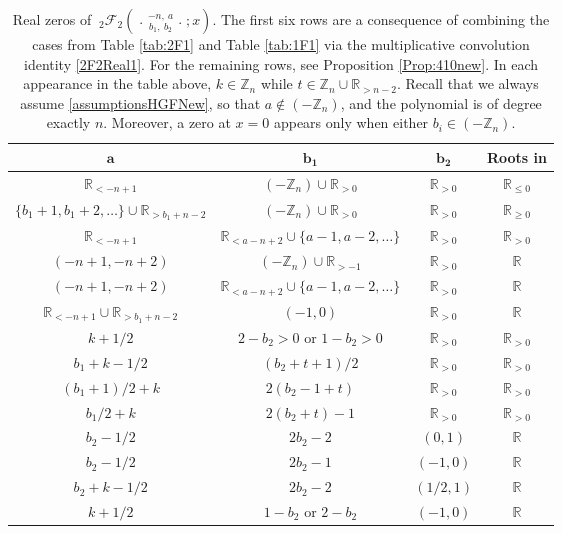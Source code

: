 \documentclass[reqno,11pt]{amsart}
\theoremstyle{remark}
\newcommand{\R}{\mathbb{R}}
\newcommand{\rr}{\mathbb{R}}
\newcommand*\pFq[5]{%
 {\ }_{#1}{\mathcal F}_{#2}{\left(\genfrac..{0pt}{}{#3}{#4};#5\right)}%
}
\begin{document}
\begin{table}[htb]
    \centering
    \begin{tabular}{|c|c|c|c|}
    \hline $\mathbf{a}$ & $\mathbf{b_1}$&$\mathbf{b_2}$ & \textbf{Roots in}  \\
\hline $ \R_{<-n+1}$ & $(- \mathbb Z_n)\cup\R_{> 0}$ & $\R_{>0}$& $\R_{\leq 0}$ \\
\hline $\{b_1+1, b_1+2, \dots\} \cup \R_{>b_1+n-2}  $ & $ (- \mathbb Z_n)\cup\R_{> 0} $& $\R_{>0}$ & $\R_{\geq 0}$   \\
\hline $\R_{<-n+1}$ & $ \R_{<a-n+2} \cup\{a-1, a-2, \dots \}$ & $\R_{>0}$ & $\R_{>0}$  \\
\hline $(-n+1,-n+2)$ & $(- \mathbb Z_n) \cup \R_{>-1}  $& $\R_{>0}$ & $\mathbb{R}$\\
\hline $(-n+1,-n+2)$ & $  \R_{<a-n+2} \cup\{a-1, a-2, \dots \} $& $\R_{>0}$ & $\mathbb{R}$  \\
\hline $\R_{<-n+1} \cup \R_{>b_1+n-2}$  & $(-1,0)$ & $\R_{>0}$& $\R$  \\   \hline 
\hline $k+1/2$  & $2-b_2>0$ or $1-b_2>0$ & $\mathbb{R}_{>0}$ 
& $\mathbb{R}_{> 0}$  \\
\hline $b_1+k-1/2$  & $(b_2+t+1)/2$ & $\mathbb{R}_{>0}$ 
& $\mathbb{R}_{> 0}$  \\
\hline $(b_1+1)/2+k$   & $ 2(b_2-1+t)$ & $\mathbb{R}_{>0}$ 
& $\mathbb{R}_{> 0}$  \\
\hline $b_1 /2+k$   & $ 2(b_2+t)-1$ & $\mathbb{R}_{>0}$ 
& $\mathbb{R}_{> 0}$  \\
\hline $b_2 -1/2 $  & $2b_2-2$  & $(0,1 )$ 
& $\mathbb{R} $  \\
\hline $b_2 -1/2 $  & $2b_2-1$  & $(-1, 0 )$ 
& $\mathbb{R} $  \\
\hline $b_2+k-1/2  $  & $2b_2-2$  & $( 1/2, 1)$ 
& $\mathbb{R} $  \\
\hline $k+1/2$  & $1-b_2$ or $2-b_2$   & $ (-1,0)  $ 
& $\mathbb{R} $  \\
\hline
\end{tabular}
\vspace{2mm}
\caption{Real zeros of $\pFq{2}{2}{-n,\  a}{ b_1,\ b_2}{x}$. The first six rows are a consequence of combining the cases from Table \ref{tab:2F1} and Table \ref{tab:1F1} via the multiplicative convolution identity \eqref{2F2Real1}. For the remaining rows, see Proposition \ref{Prop:410new}. In each appearance in the table above, $k\in \mathbb Z_n $ while $t\in \mathbb Z_n \cup  \rr_{>n-2}$. Recall that we always assume \eqref{assumptionsHGFNew}, so that $  a \notin (-\mathbb Z_n)$, and the polynomial is of degree exactly $n$. Moreover, a zero at $x=0$ appears only when either $ b_i \in (- \mathbb Z_n)$.  }
    \label{tab:2F2}
\end{table}
\end{document}
